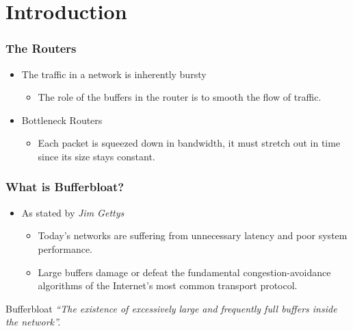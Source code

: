 \section{Introduction}

\begin{frame}
	\frametitle{The Routers}
	
	\begin{itemize}
		\item The traffic in a network is inherently bursty
			\begin{itemize}
				\item The role of the buffers in the router is to smooth the flow of traffic.
			\end{itemize}
		\item Bottleneck Routers
			\begin{itemize}
				\item Each packet is squeezed down in bandwidth, it must stretch out in time since its size stays constant.
			\end{itemize}
	\end{itemize}
	

\end{frame}

\begin{frame}
	\frametitle{What is Bufferbloat?}
	\begin{itemize}
	\item As stated by \textit{Jim Gettys}
		\begin{itemize}
			\item Today’s networks are suffering from unnecessary latency and poor system performance.
			\item Large buffers damage or defeat the fundamental congestion-avoidance algorithms of the Internet’s most common transport protocol.
		\end{itemize}
	\end{itemize}

	\begin{block}{Bufferbloat}
		\textit{``The existence of excessively large and frequently full buffers inside the network''.}
	\end{block}
\end{frame}

